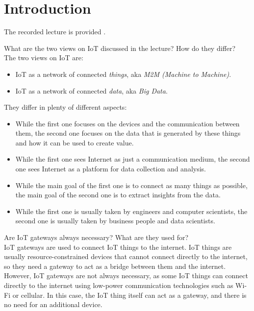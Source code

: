\section{Introduction}

The recorded lecture is provided .

\begin{ejercicio}
    What are the two views on IoT discussed in the lecture? How do they differ?\\

    The two views on IoT are:
\begin{itemize}
    \item IoT as a network of connected \emph{things}, aka \emph{M2M (Machine to Machine)}.
    \item IoT as a network of connected \emph{data}, aka \emph{Big Data}.
\end{itemize}

    They differ in plenty of different aspects:
\begin{itemize}
    \item While the first one focuses on the devices and the communication between them, the second one focuses on the data that is generated by these things and how it can be used to create value.
    \item While the first one sees Internet as just a communication medium, the second one sees Internet as a platform for data collection and analysis.
    \item While the main goal of the first one is to connect as many things as possible, the main goal of the second one is to extract insights from the data.
    \item While the first one is usually taken by engineers and computer scientists, the second one is usually taken by business people and data scientists.
\end{itemize}
\end{ejercicio}

\begin{ejercicio}
    Are IoT gateways always necessary? What are they used for?\\

    IoT gateways are used to connect IoT things to the internet. IoT things are usually resource-constrained devices that cannot connect directly to the internet, so they need a gateway to act as a bridge between them and the internet. However, IoT gateways are not always necessary, as some IoT things can connect directly to the internet using low-power communication technologies such as Wi-Fi or cellular. In this case, the IoT thing itself can act as a gateway, and there is no need for an additional device.
\end{ejercicio}